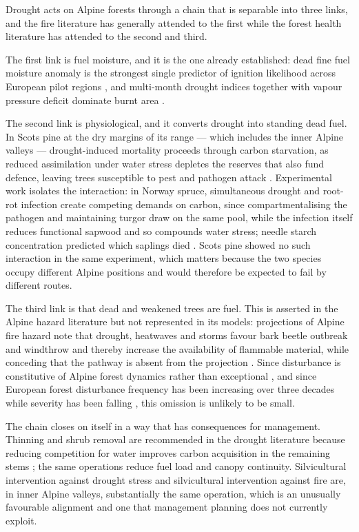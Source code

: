 \documentclass[11pt,a4paper]{article}
\begin{document}
Drought acts on Alpine forests through a chain that is separable into three links, and the fire literature has generally attended to the first while the forest health literature has attended to the second and third.

The first link is fuel moisture, and it is the one already established: dead fine fuel moisture anomaly is the strongest single predictor of ignition likelihood across European pilot regions \citep{gelabert_assessing_2025}, and multi-month drought indices together with vapour pressure deficit dominate burnt area \citep{miller_compounding_2025, beloiu_climatedriven_2026}.

The second link is physiological, and it converts drought into standing dead fuel. In Scots pine at the dry margins of its range --- which includes the inner Alpine valleys --- drought-induced mortality proceeds through carbon starvation, as reduced assimilation under water stress depletes the reserves that also fund defence, leaving trees susceptible to pest and pathogen attack \citep{giuggiola_droughtinduced_2010}. Experimental work isolates the interaction: in Norway spruce, simultaneous drought and root-rot infection create competing demands on carbon, since compartmentalising the pathogen and maintaining turgor draw on the same pool, while the infection itself reduces functional sapwood and so compounds water stress; needle starch concentration predicted which saplings died \citep{gomezgallego_interaction_2022}. Scots pine showed no such interaction in the same experiment, which matters because the two species occupy different Alpine positions and would therefore be expected to fail by different routes.

The third link is that dead and weakened trees are fuel. This is asserted in the Alpine hazard literature but not represented in its models: projections of Alpine fire hazard note that drought, heatwaves and storms favour bark beetle outbreak and windthrow and thereby increase the availability of flammable material, while conceding that the pathway is absent from the projection \citep{gerberding_mapping_2025}. Since disturbance is constitutive of Alpine forest dynamics rather than exceptional \citep{bebi_changes_2017}, and since European forest disturbance frequency has been increasing over three decades while severity has been falling \citep{senf_mapping_2021}, this omission is unlikely to be small.

The chain closes on itself in a way that has consequences for management. Thinning and shrub removal are recommended in the drought literature because reducing competition for water improves carbon acquisition in the remaining stems \citep{giuggiola_droughtinduced_2010}; the same operations reduce fuel load and canopy continuity. Silvicultural intervention against drought stress and silvicultural intervention against fire are, in inner Alpine valleys, substantially the same operation, which is an unusually favourable alignment and one that management planning does not currently exploit.
\end{document}
